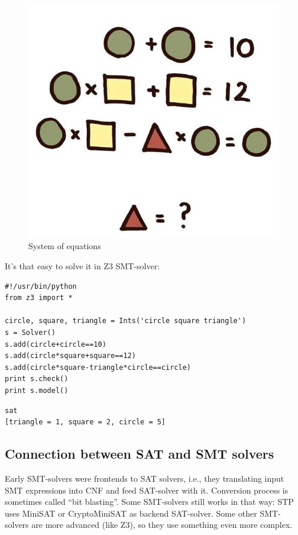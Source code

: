 \begin{figure}[H]
\centering
\includegraphics[scale=0.3]{SMT/equation.jpg}
\caption{System of equations}
\end{figure}

It's that easy to solve it in Z3 \ac{SMT}-solver:

\begin{lstlisting}
#!/usr/bin/python
from z3 import *

circle, square, triangle = Ints('circle square triangle')
s = Solver()
s.add(circle+circle==10)
s.add(circle*square+square==12)
s.add(circle*square-triangle*circle==circle)
print s.check()
print s.model()
\end{lstlisting}

\begin{lstlisting}
sat
[triangle = 1, square = 2, circle = 5]
\end{lstlisting}



\subsection{Connection between \ac{SAT} and \ac{SMT} solvers}

Early \ac{SMT}-solvers were frontends to \ac{SAT} solvers, i.e., they translating input SMT expressions into \ac{CNF} and feed SAT-solver with it.
Conversion process is sometimes called ``bit blasting''.
Some \ac{SMT}-solvers still works in that way: STP uses MiniSAT or CryptoMiniSAT as backend SAT-solver.
Some other \ac{SMT}-solvers are more advanced (like Z3), so they use something even more complex.








